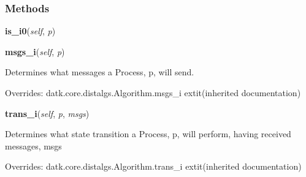 
  \subsubsection{Methods}

    \label{datk:core:algs:SynchBFS:is_i0}

    \vspace{0.5ex}

\hspace{.8\funcindent}\begin{boxedminipage}{\funcwidth}

    \raggedright \textbf{is\_i0}(\textit{self}, \textit{p})

\setlength{\parskip}{2ex}
\setlength{\parskip}{1ex}
    \end{boxedminipage}

    \vspace{0.5ex}

\hspace{.8\funcindent}\begin{boxedminipage}{\funcwidth}

    \raggedright \textbf{msgs\_i}(\textit{self}, \textit{p})

\setlength{\parskip}{2ex}
    Determines what messages a Process, p, will send.

\setlength{\parskip}{1ex}
      Overrides: datk.core.distalgs.Algorithm.msgs\_i 	extit{(inherited documentation)}

    \end{boxedminipage}

    \vspace{0.5ex}

\hspace{.8\funcindent}\begin{boxedminipage}{\funcwidth}

    \raggedright \textbf{trans\_i}(\textit{self}, \textit{p}, \textit{msgs})

\setlength{\parskip}{2ex}
    Determines what state transition a Process, p, will perform, having 
    received messages, msgs

\setlength{\parskip}{1ex}
      Overrides: datk.core.distalgs.Algorithm.trans\_i 	extit{(inherited documentation)}

    \end{boxedminipage}


